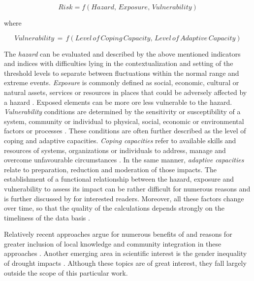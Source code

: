         \[Risk = f(Hazard,\, Exposure,\, Vulnerability)\]

    where

        \[Vulnerability\, =\, f(Level\, of\, Coping\, Capacity,\, Level\, of\, Adaptive\, Capacity)\]
\hfill {\footnotesize \autocite{boultDroughtImpactbasedForecasting2022,harrowsmithFutureForecastImpact2020,vereintenationenSpecialReportDrought2021}}

The \textit{hazard} can be evaluated and described by the above mentioned indicators and indices with difficulties lying in the contextualization and setting of the threshold levels to separate between fluctuations within the normal range and extreme events. \textit{Exposure} is commonly defined as social, economic, cultural or natural assets, services or resources in places that could be adversely affected by a hazard \autocite{ipccClimateChange20142014}. Exposed elements can be more ore less vulnerable to the hazard. \textit{Vulnerability} conditions are determined by the sensitivity or susceptibility of a system, community or individual to physical, social, economic or environmental factors or processes \autocite{ipccClimateChange20142014}. These conditions are often further described as the level of coping and adaptive capacities. \textit{Coping capacities} refer to available skills and resources of systems, organizations or individuals to address, manage and overcome unfavourable circumstances \autocite{ipccGlossaryTerms2012}. In the same manner, \textit{adaptive capacities} relate to preparation, reduction and moderation of those impacts.\newline
The establishment of a functional relationship between the hazard, exposure and vulnerability to assess its impact can be rather difficult for numerous reasons and is further discussed by \autocite{boultDroughtImpactbasedForecasting2022} for interested readers. Moreover, all these factors change over time, so that the quality of the calculations depends strongly on the timeliness of the data basis \autocite{harrowsmithFutureForecastImpact2020}.

Relatively recent approaches argue for numerous benefits of and reasons for greater inclusion of local knowledge and community integration in these approaches \autocite{balehegnIndigenousWeatherClimate2019,dubeFrameworkIntegrationTraditional2016,ebhuomaFrameworkIntegratingScientific2020,giordanoIntegrationLocalScientific2013a,greyIntegratingLocalIndigenous2020,hermansExploringIntegrationLocal2022a,mercerCultureDisasterRisk2012,mutasaKnowledgeApartheidDisaster2015,nyetanyaneIntegrationIndigenousKnowledge2020,nyongValueIndigenousKnowledge2007}. Another emerging area in scientific interest is the gender inequality of drought impacts \autocite{acharyaWhenRiverTalks2019,fanningDroughtDisplacementLivelihoods2018,hiwasakiLocalIndigenousKnowledge2015,mustafaGenderingFloodEarly2015,sachsRoutledgeHandbookGender2020,saniGenderOtherVulnerabilities2022}. Although these topics are of great interest, they fall largely outside the scope of this particular work.

